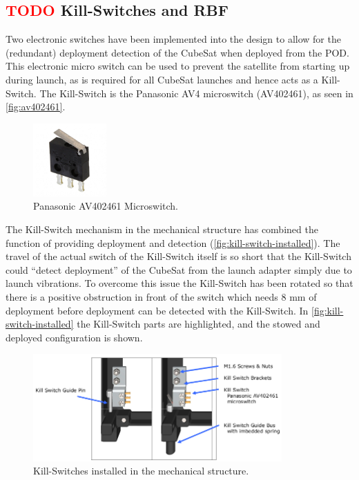 \subsection{ \textcolor{red}{TODO} Kill-Switches and RBF}

Two electronic switches have been implemented into the design to allow for the (redundant) deployment detection of the CubeSat when deployed from the POD. This electronic micro switch can be used to prevent the satellite from starting up during launch, as is required for all CubeSat launches and hence acts as a Kill-Switch. The Kill-Switch is the Panasonic AV4 microswitch (AV402461), as seen in \autoref{fig:av402461}.

\begin{figure}[!ht]
    \begin{center}
        \includegraphics[width=0.25\textwidth]{figures/subsystems/av402461}
        \caption{Panasonic AV402461 Microswitch.}
        \label{fig:av402461}
    \end{center}
\end{figure}

The Kill-Switch mechanism in the mechanical structure has combined the function of providing deployment and detection (\autoref{fig:kill-switch-installed}). The travel of the actual switch of the Kill-Switch itself is so short that the Kill-Switch could ``detect deployment'' of the CubeSat from the launch adapter simply due to launch vibrations. To overcome this issue the Kill-Switch has been rotated so that there is a positive obstruction in front of the switch which needs 8 mm of deployment before deployment can be detected with the Kill-Switch. In \autoref{fig:kill-switch-installed} the Kill-Switch parts are highlighted, and the stowed and deployed configuration is shown.

\begin{figure}[!ht]
    \begin{center}
        \includegraphics[width=0.85\textwidth]{figures/subsystems/kill-switch-installed}
        \caption{Kill-Switches installed in the mechanical structure.}
        \label{fig:kill-switch-installed}
    \end{center}
\end{figure}

